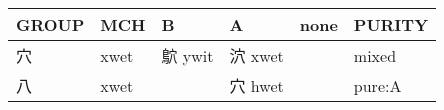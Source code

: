 \documentclass[14pt,a4paper]{scrartcl}
\begin{document}
\begin{longtable}[c]{@{}llllll@{}}
\toprule
\begin{minipage}[b]{0.14\columnwidth}\raggedright\strut
GROUP
\strut\end{minipage} &
\begin{minipage}[b]{0.14\columnwidth}\raggedright\strut
MCH
\strut\end{minipage} &
\begin{minipage}[b]{0.14\columnwidth}\raggedright\strut
B
\strut\end{minipage} &
\begin{minipage}[b]{0.14\columnwidth}\raggedright\strut
A
\strut\end{minipage} &
\begin{minipage}[b]{0.14\columnwidth}\raggedright\strut
none
\strut\end{minipage} &
\begin{minipage}[b]{0.14\columnwidth}\raggedright\strut
PURITY
\strut\end{minipage}\tabularnewline
\midrule
\endhead
\begin{minipage}[t]{0.14\columnwidth}\raggedright\strut
穴
\strut\end{minipage} &
\begin{minipage}[t]{0.14\columnwidth}\raggedright\strut
xwet
\strut\end{minipage} &
\begin{minipage}[t]{0.14\columnwidth}\raggedright\strut
鴥 ywit
\strut\end{minipage} &
\begin{minipage}[t]{0.14\columnwidth}\raggedright\strut
泬 xwet
\strut\end{minipage} &
\begin{minipage}[t]{0.14\columnwidth}\raggedright\strut
\strut\end{minipage} &
\begin{minipage}[t]{0.14\columnwidth}\raggedright\strut
mixed
\strut\end{minipage}\tabularnewline
\begin{minipage}[t]{0.14\columnwidth}\raggedright\strut
八
\strut\end{minipage} &
\begin{minipage}[t]{0.14\columnwidth}\raggedright\strut
xwet
\strut\end{minipage} &
\begin{minipage}[t]{0.14\columnwidth}\raggedright\strut
\strut\end{minipage} &
\begin{minipage}[t]{0.14\columnwidth}\raggedright\strut
穴 hwet
\strut\end{minipage} &
\begin{minipage}[t]{0.14\columnwidth}\raggedright\strut
\strut\end{minipage} &
\begin{minipage}[t]{0.14\columnwidth}\raggedright\strut
pure:A
\strut\end{minipage}\tabularnewline
\bottomrule
\end{longtable}
\end{document}
